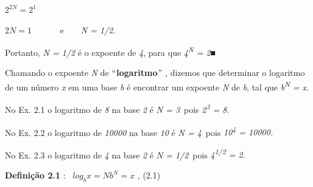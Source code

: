 \documentclass[12pt]{article}
\begin{document}
\begin{enumerate}[label*={\fontsize{14pt}{14pt}\selectfont \textbf{\arabic*.}}]
\begin{justify}
 \( 2^{2N}=2^{1} \) \ \ \  
\end{justify}\par

\begin{justify}
 \( 2N=1 \) \ \ \ \ \ \  e\ \ \ \  \textit{N = 1/2.}
\end{justify}\par

\begin{justify}
Portanto, \textit{N = 1/2} é o expoente de \textit{4}, para que \textit{4\textsuperscript{N} = 2}■
\end{justify}\par


\vspace{\baselineskip}
\begin{justify}
Chamando o expoente \textit{N} de $``$\textbf{logaritmo}$"$ , dizemos que determinar o logaritmo de um número \textit{x} em uma base \textit{b} é encontrar um expoente \textit{N} de \textit{b}, tal que \textit{b\textsuperscript{N} = x}.
\end{justify}\par

\begin{justify}
No Ex. 2.1 o logaritmo de \textit{8} na base \textit{2} é \textit{N = 3}\  pois \textit{2\textsuperscript{3} = 8.}
\end{justify}\par

\begin{justify}
No Ex. 2.2 o logaritmo de \textit{10000} na base \textit{10} é \textit{N = 4}\  pois \textit{10\textsuperscript{4} = 10000.}
\end{justify}\par

\begin{justify}
No Ex. 2.3 o logaritmo de \textit{4} na base \textit{2} é \textit{N = 1/2}\  pois \textit{4\textsuperscript{1/2} = 2.}
\end{justify}\par

\par 
\begin{justify}
\textbf{Definição 2.1 }: \tab \   \( log_{b}x=N  b^{N}=x \) , \tab \tab \tab \tab (2.1)
\end{justify}\par


\end{enumerate}
\end{document}
